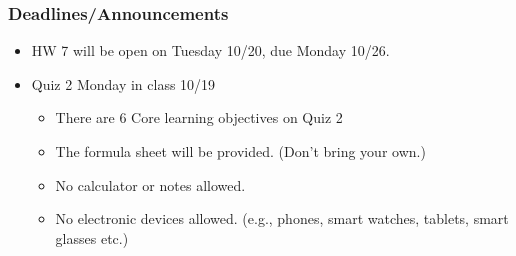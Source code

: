 
\begin{frame}
    \frametitle{Deadlines/Announcements}
\begin{itemize}
        \item HW 7 will be open on Tuesday 10/20, due Monday 10/26.
        \item Quiz 2 Monday in class 10/19
        \begin{itemize}
            \item There are 6 Core learning objectives on Quiz 2
            \item The formula sheet will be provided. (Don't bring your own.)
            \item No calculator or notes allowed.
            \item No electronic devices allowed. (e.g., phones, smart watches, tablets, smart glasses etc.)
    \end{itemize}
        \end{itemize}
\end{frame}

